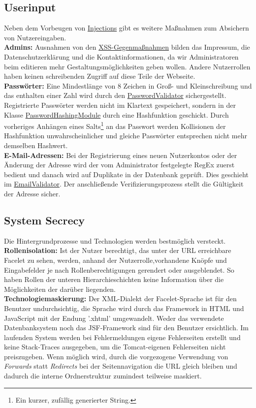 \documentclass{article}
\begin{document}
\subsection{Userinput}
Neben dem Vorbeugen von \hyperlink{Injections}{Injections} gibt es weitere Maßnahmen zum Absichern von Nutzereingaben.\\
\textbf{Admins:} Ausnahmen von den \hyperlink{XSS}{XSS-Gegenmaßnahmen} bilden das Impressum, die Datenschutzerklärung und  die Kontaktinformationen, da wir Administratoren beim editieren mehr Gestaltungsmöglichkeiten geben wollen. Andere Nutzerrollen haben keinen schreibenden Zugriff auf diese Teile der Webseite.\\
\textbf{Passwörter:} Eine Mindestlänge von 8 Zeichen in Groß- und Kleinschreibung und das enthalten einer Zahl wird durch den \hyperlink{Validator}{PasswordValidator} sichergestellt. Registrierte Passwörter werden nicht im Klartext gespeichert, sondern in der Klasse \hyperlink{Hash}{PasswordHashingModule} durch eine Hashfunktion geschickt. Durch vorheriges Anhängen eines Salts\footnote{Ein kurzer, zufällig generierter String.} an das Passwort werden Kollisionen der Hashfunktion unwahrscheinlicher und gleiche Passwörter entsprechen nicht mehr demselben Hashwert.\\
\textbf{E-Mail-Adressen:} Bei der Registrierung eines neuen Nutzerkontos oder der Änderung der Adresse wird der vom Administrator festgelegte RegEx zuerst bedient und danach wird auf Duplikate in der Datenbank geprüft. Dies geschieht im \hyperlink{Validator}{EmailValidator}. Der anschließende Verifizierungsprozess stellt die Gültigkeit der Adresse sicher.
\subsection{System Secrecy}
Die Hintergrundprozesse und Technologien werden bestmöglich versteckt.\\
\textbf{Rollenisolation:} Ist der Nutzer berechtigt, das unter der URL erreichbare Facelet zu sehen, werden, anhand der Nutzerrolle,vorhandene Knöpfe und Eingabefelder je nach Rollenberechtigungen gerendert oder ausgeblendet. So haben Rollen der unteren Hierarchieschichten keine Information über die Möglichkeiten der darüber liegenden.\\
\textbf{Technologiemaskierung:} Der XML-Dialekt der Facelet-Sprache ist für den Benutzer undurchsichtig, die Sprache wird durch das Framework in HTML und JavaScript mit der Endung '.xhtml' umgewandelt. Weder das verwendete Datenbanksystem noch das JSF-Framework sind für den Benutzer ersichtlich. Im laufenden System werden bei Fehlermeldungen eigene Fehlerseiten erstellt und keine Stack-Traces ausgegeben, um die Tomcat-eigenen Fehlerseiten nicht preiszugeben. Wenn möglich wird, durch die vorgezogene Verwendung von \textit{Forwards} statt \textit{Redirects} bei der Seitennavigation die URL gleich bleiben und dadurch die interne Ordnerstruktur zumindest teilweise maskiert.
\end{document}
